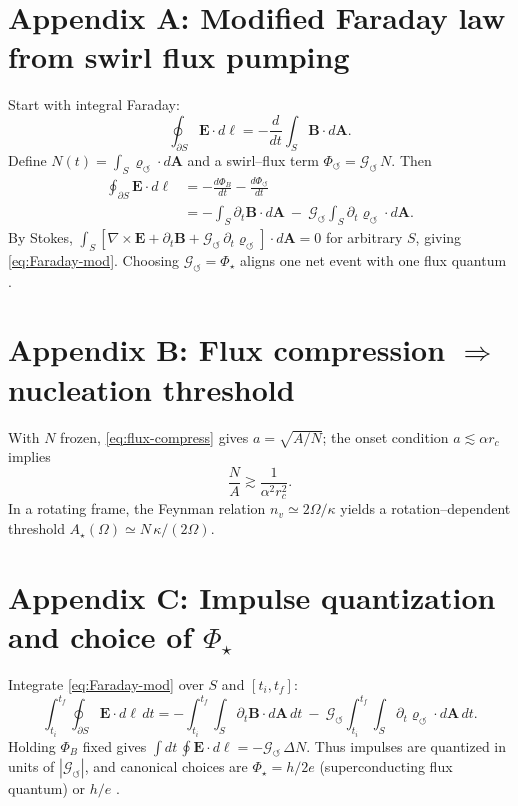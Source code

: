 \documentclass[12pt]{article}
\newcommand{\rc}{r_c}
\newcommand{\bmvarrho}{\bm{\varrho}_{\!\boldsymbol{\circlearrowleft}}}
\newcommand{\Gsw}{\mathcal{G}_{\!\boldsymbol{\circlearrowleft}}}
\begin{document}
\section*{Appendix A: Modified Faraday law from swirl flux pumping}
\label{app:Faraday}
Start with integral Faraday:
\begin{equation}
\oint_{\partial S}\mathbf E\!\cdot d\boldsymbol\ell
=-\frac{d}{dt}\int_S\mathbf B\!\cdot d\mathbf A.
\label{eq:Faraday-int}
\end{equation}
Define $N(t)=\int_S \bmvarrho\!\cdot d\mathbf A$ and a swirl–flux term $\Phi_{\!\boldsymbol{\circlearrowleft}}=\Gsw\,N$. Then
\begin{align}
\oint_{\partial S}\mathbf E\!\cdot d\boldsymbol\ell
&=-\frac{d\Phi_B}{dt}-\frac{d\Phi_{\!\boldsymbol{\circlearrowleft}}}{dt}
\nonumber\\
&=-\int_S \partial_t\mathbf B\!\cdot d\mathbf A\ -\ \Gsw\int_S \partial_t\bmvarrho\!\cdot d\mathbf A.
\end{align}
By Stokes, $\int_S [\nabla\times\mathbf E+\partial_t\mathbf B+\Gsw\,\partial_t\bmvarrho]\!\cdot d\mathbf A=0$ for arbitrary $S$, giving \eqref{eq:Faraday-mod}. Choosing $\Gsw=\Phi_\star$ aligns one net event with one flux quantum \cite{Deaver1961,Doll1961}.

\section*{Appendix B: Flux compression $\Rightarrow$ nucleation threshold}
\label{app:Threshold}
With $N$ frozen, \eqref{eq:flux-compress} gives $a=\sqrt{A/N}$; the onset condition $a\lesssim\alpha\rc$ implies
\begin{equation}
\frac{N}{A}\gtrsim\frac{1}{\alpha^2\rc^2}.
\end{equation}
In a rotating frame, the Feynman relation $n_v\simeq 2\Omega/\kappa$ \cite{Feynman1955} yields a rotation–dependent threshold $A_\star(\Omega)\simeq N\,\kappa/(2\Omega)$.

\section*{Appendix C: Impulse quantization and choice of $\Phi_\star$}
\label{app:Impulse}
Integrate \eqref{eq:Faraday-mod} over $S$ and $[t_i,t_f]$:
\begin{equation}
\int_{t_i}^{t_f}\!\!\oint_{\partial S}\mathbf E\!\cdot d\boldsymbol\ell\,dt
=-\int_{t_i}^{t_f}\!\!\int_S \partial_t\mathbf B\!\cdot d\mathbf A\,dt\ -\ \Gsw\int_{t_i}^{t_f}\!\!\int_S \partial_t\bmvarrho\!\cdot d\mathbf A\,dt.
\end{equation}
Holding $\Phi_B$ fixed gives $\int dt\,\oint \mathbf E\!\cdot d\boldsymbol\ell=-\Gsw\,\Delta N$. Thus impulses are quantized in units of $|\Gsw|$, and canonical choices are $\Phi_\star=h/2e$ (superconducting flux quantum) or $h/e$ \cite{Deaver1961,Doll1961}.
\end{document}
